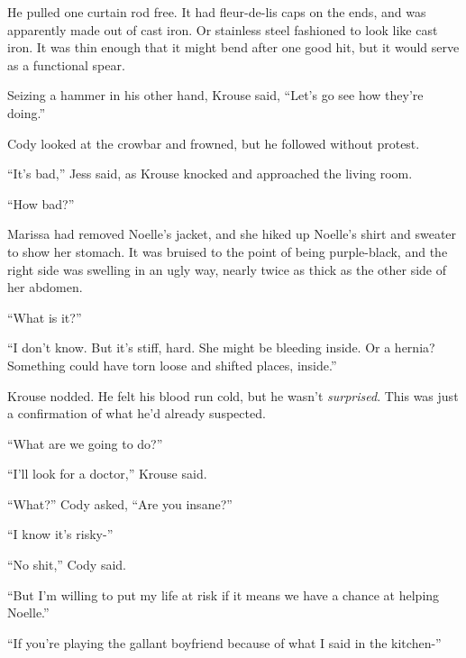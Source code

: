 He pulled one curtain rod free.  It had fleur-de-lis caps on the ends, and was apparently made out of cast iron.  Or stainless steel fashioned to look like cast iron.  It was thin enough that it might bend after one good hit, but it would serve as a functional spear.



Seizing a hammer in his other hand, Krouse said, ``Let's go see how they're doing.''



Cody looked at the crowbar and frowned, but he followed without protest.



``It's bad,'' Jess said, as Krouse knocked and approached the living room.



``How bad?''



Marissa had removed Noelle's jacket, and she hiked up Noelle's shirt and sweater to show her stomach.  It was bruised to the point of being purple-black, and the right side was swelling in an ugly way, nearly twice as thick as the other side of her abdomen.



``What is it?''



``I don't know.  But it's stiff, hard.  She might be bleeding inside.  Or a hernia?  Something could have torn loose and shifted places, inside.''



Krouse nodded.  He felt his blood run cold, but he wasn't \emph{surprised}.  This was just a confirmation of what he'd already suspected.



``What are we going to do?''



``I'll look for a doctor,'' Krouse said.



``What?'' Cody asked, ``Are you insane?''



``I know it's risky-''



``No shit,'' Cody said.



``But I'm willing to put my life at risk if it means we have a chance at helping Noelle.''



``If you're playing the gallant boyfriend because of what I said in the kitchen-''



